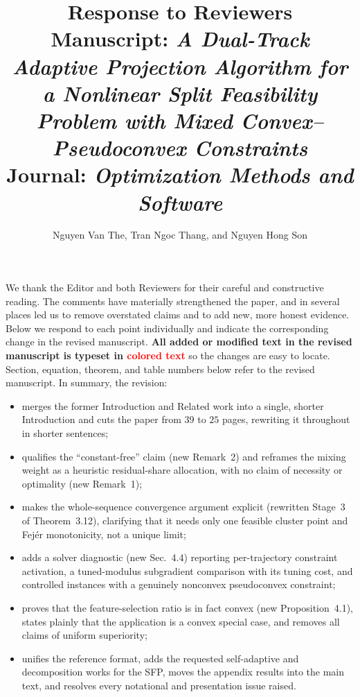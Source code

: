 \documentclass[11pt]{article}
\title{\vspace{-2em}Response to Reviewers\\[0.3em]
\large Manuscript: \emph{A Dual-Track Adaptive Projection Algorithm for a Nonlinear
Split Feasibility Problem with Mixed Convex--Pseudoconvex Constraints}\\[0.2em]
\normalsize Journal: \emph{Optimization Methods and Software}}
\author{Nguyen Van The, Tran Ngoc Thang, and Nguyen Hong Son}
\date{}
\begin{document}
\maketitle
\vspace{-2em}

\noindent We thank the Editor and both Reviewers for their careful and constructive
reading. The comments have materially strengthened the paper, and in several places led
us to remove overstated claims and to add new, more honest evidence. Below we respond to
each point individually and indicate the corresponding change in the revised manuscript.
\textbf{All added or modified text in the revised manuscript is typeset in
\textcolor{red}{colored text}} so the changes are easy to locate. Section, equation,
theorem, and table numbers below refer to the revised manuscript. In summary, the
revision:
\begin{itemize}[nosep]
  \item merges the former Introduction and Related work into a single, shorter
        Introduction and cuts the paper from $39$ to $25$ pages, rewriting it throughout
        in shorter sentences;
  \item qualifies the ``constant-free'' claim (new Remark~2) and reframes the mixing
        weight as a heuristic residual-share allocation, with no claim of necessity or
        optimality (new Remark~1);
  \item makes the whole-sequence convergence argument explicit (rewritten Stage~3 of
        Theorem~3.12), clarifying that it needs only one feasible cluster point and
        Fej\'er monotonicity, not a unique limit;
  \item adds a solver diagnostic (new Sec.~4.4) reporting per-trajectory constraint
        activation, a tuned-modulus subgradient comparison with its tuning cost, and
        controlled instances with a genuinely nonconvex pseudoconvex constraint;
  \item proves that the feature-selection ratio is in fact convex (new Proposition~4.1),
        states plainly that the application is a convex special case, and removes all
        claims of uniform superiority;
  \item unifies the reference format, adds the requested self-adaptive and decomposition
        works for the SFP, moves the appendix results into the main text, and resolves
        every notational and presentation issue raised.
\end{itemize}

\end{document}
